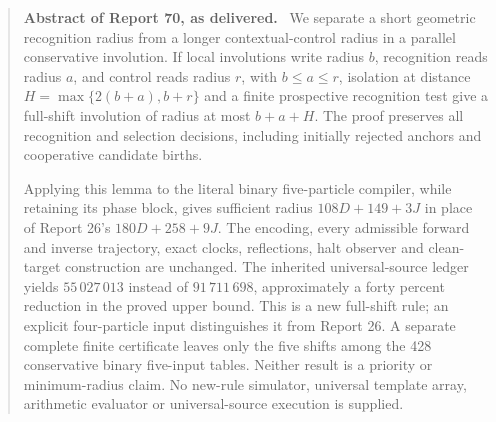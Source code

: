 \documentclass[11pt,a4paper]{article}
\numberwithin{equation}{section}
\newenvironment{reportabstract}[1]{\begin{quote}\small\textbf{Abstract of Report #1, as delivered.}\ }{\end{quote}}
\begin{document}
\begin{reportabstract}{70}
We separate a short geometric recognition radius from a longer contextual-control radius in a parallel conservative involution. If local involutions write radius $b$, recognition reads radius $a$, and control reads radius $r$, with $b\le a\le r$, isolation at distance $H=\max\{2(b+a),b+r\}$ and a finite prospective recognition test give a full-shift involution of radius at most $b+a+H$. The proof preserves all recognition and selection decisions, including initially rejected anchors and cooperative candidate births.

Applying this lemma to the literal binary five-particle compiler, while retaining its phase block, gives sufficient radius $108D+149+3J$ in place of Report 26's $180D+258+9J$. The encoding, every admissible forward and inverse trajectory, exact clocks, reflections, halt observer and clean-target construction are unchanged. The inherited universal-source ledger yields $55\,027\,013$ instead of $91\,711\,698$, approximately a forty percent reduction in the proved upper bound. This is a new full-shift rule; an explicit four-particle input distinguishes it from Report 26. A separate complete finite certificate leaves only the five shifts among the 428 conservative binary five-input tables. Neither result is a priority or minimum-radius claim. No new-rule simulator, universal template array, arithmetic evaluator or universal-source execution is supplied.
\end{reportabstract}
\end{document}
